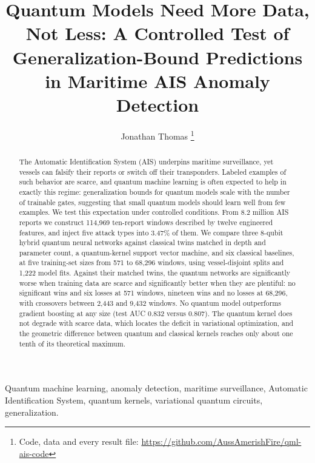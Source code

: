 \documentclass[journal]{IEEEtran}
\begin{document}
\title{Quantum Models Need More Data, Not Less: A Controlled Test of
Generalization-Bound Predictions in Maritime AIS Anomaly Detection}

\author{Jonathan Thomas%
\thanks{Code, data and every result file: \url{https://github.com/AussAmerishFire/qml-ais-code}}}

\markboth{}{}
\maketitle

\begin{abstract}
The Automatic Identification System (AIS) underpins maritime surveillance, yet
vessels can falsify their reports or switch off their transponders. Labeled
examples of such behavior are scarce, and quantum machine learning is often
expected to help in exactly this regime: generalization bounds for quantum
models scale with the number of trainable gates, suggesting that small quantum
models should learn well from few examples. We test this expectation under
controlled conditions. From 8.2 million AIS reports we construct 114,969
ten-report windows described by twelve engineered features, and inject five
attack types into 3.47\% of them. We compare three 8-qubit hybrid quantum neural
networks against classical twins matched in depth and parameter count, a
quantum-kernel support vector machine, and six classical baselines, at five
training-set sizes from 571 to 68,296 windows, using vessel-disjoint splits and
1,222 model fits. Against their matched twins, the quantum networks are
significantly worse when training data are scarce and significantly better when
they are plentiful: no significant wins and six losses at 571 windows, nineteen
wins and no losses at 68,296, with crossovers between 2,443 and 9,432 windows.
No quantum model outperforms gradient boosting at any size (test AUC 0.832
versus 0.807). The quantum kernel does not degrade with scarce data, which
locates the deficit in variational optimization, and the geometric difference
between quantum and classical kernels reaches only about one tenth of its
theoretical maximum.
\end{abstract}

\begin{IEEEkeywords}
Quantum machine learning, anomaly detection, maritime surveillance, Automatic
Identification System, quantum kernels, variational quantum circuits,
generalization.
\end{IEEEkeywords}
\end{document}
